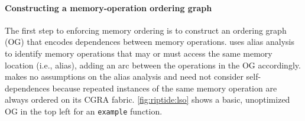 \paragraph{Constructing a memory-operation ordering graph} 
The first step to enforcing memory ordering is to construct an ordering graph (OG) that encodes dependences between memory operations.
% 
\riptide uses alias analysis to identify memory operations
that may or must access the same memory location (i.e., alias), adding an arc between the operations in the OG accordingly.
%
\riptide makes no assumptions on the alias analysis and
%
%
need not consider self-dependences because repeated instances of the
same memory operation are always ordered on its CGRA fabric. %
%
\autoref{fig:riptide:lso} shows a basic, unoptimized OG in the top left for an 
{\tt example} function.

